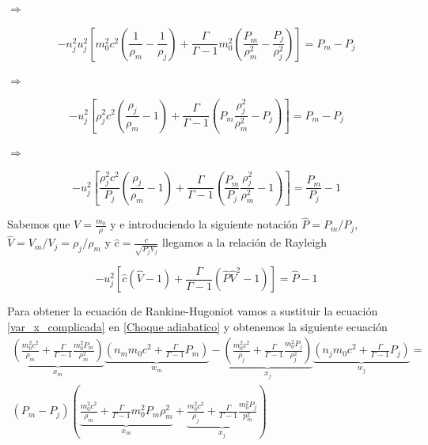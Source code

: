 \documentclass[12pt,a4paper]{book}
\begin{document}
$\Rightarrow$

\begin{equation}
-n_j^2 u_j^2 
\left[m_0^2 c^2 \left( \frac{1}{\rho_m} - \frac{1}{\rho_j} \right)+
\frac{\Gamma}{\Gamma-1} m_0^2 \left( \frac{P_m}{\rho_m^2}- \frac{P_j}{\rho_j^2}\right) \right] = 
P_m - P_j
\end{equation}

$\Rightarrow$

\begin{equation}
-u_j^2 
\left[\rho_j^2 c^2 \left( \frac{\rho_j}{\rho_m} - 1 \right)+
\frac{\Gamma}{\Gamma-1} \left( P_m \frac{\rho_j^2}{\rho_m^2} - P_j \right) \right] = 
P_m - P_j
\end{equation}

$\Rightarrow$

\begin{equation}
-u_j^2 
\left[\frac{\rho_j^2 c^2}{P_j}  \left( \frac{\rho_j}{\rho_m} - 1 \right)+
\frac{\Gamma}{\Gamma-1} \left( \frac{P_m}{P_j} \frac{\rho_j^2}{\rho_m^2} - 1 \right) \right] = 
\frac{P_m}{P_j} - 1
\end{equation}


Sabemos que $V = \frac{m_0}{\rho}$ y e introduciendo la siguiente notación $\hat{P}=P_m/P_j$, $\hat{V}=V_m/V_j = \rho_j / \rho_m$ y $\hat{c} = \frac{c}{\sqrt{P_j V_j}}$ llegamos a la relación de Rayleigh

\begin{equation}
-u_j^2
\left[ \hat{c}  \left( \hat{V} - 1 \right)+
\frac{\Gamma}{\Gamma-1} \left( \hat{P} \hat{V}^2 - 1 \right) \right] = 
\hat{P} - 1
\end{equation}

Para obtener la ecuación de Rankine-Hugoniot vamos a sustituir la ecuación \ref{var_x_complicada} en \ref{Choque adiabatico} y obtenemos la siguiente ecuación
\begin{eqnarray}\label{Ecuacion_a_desarrollar}
\underbrace { \left( \frac { m _ { 0 } ^ { 2 } c ^ { 2 } } { \rho _ { m } } + \frac { \Gamma } { \Gamma - 1 } \frac { m _ { 0 } ^ { 2 } P _ { m } } { \rho _ { m } ^ { 2 } } \right) } _ { x _ { m } } \underbrace { \left( n _ { m } m _ { 0 } c ^ { 2 } + \frac { \Gamma } { \Gamma - 1 } P _ { m } \right) } _ { w _ { m } }
- \underbrace { \left( \frac { m _ { 0 } ^ { 2 } c ^ { 2 } } { \rho _ { j } } + \frac { \Gamma } { \Gamma - 1 } \frac { m _ { 0 } ^ { 2 } P _ { j } } { \rho _ { j } ^ { 2 } } \right) } _ { x _ { j } } \underbrace { \left( n _ { j } m _ { 0 } c ^ { 2 } + \frac { \Gamma } { \Gamma - 1 } P _ { j } \right) } _ { w _ { j } } = \nonumber \\ 
\left( P _ { m } - P _ { j } \right) \left( \underbrace { \frac { m _ { 0 } ^ { 2 } c ^ { 2 } } { \rho _ { m } } + \frac { \Gamma } { \Gamma - 1 }  { m _ { 0 } ^ { 2 } P _ { m } } { \rho _ { m } ^ { 2 } } } _ { x _ { m } } + \underbrace { \frac { m _ { 0 } ^ { 2 } c ^ { 2 } } { \rho _ { j } } + \frac { \Gamma } { \Gamma - 1 } \frac { m _ { 0 } ^ { 2 } P _ { j } } { p _ { m } ^ { 2 } } } _ { x _ { j } } \right)
\end{eqnarray}
\end{document}

